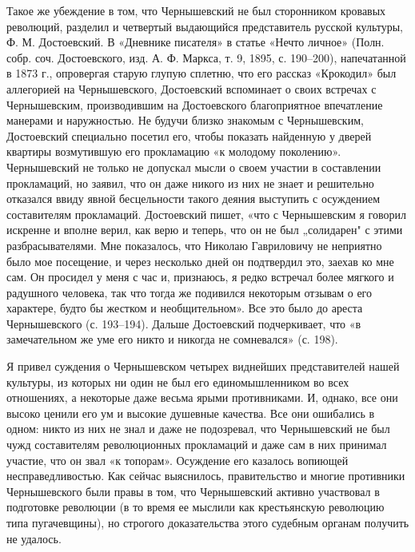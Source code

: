 Такое же убеждение в том, что Чернышевский не был сторонником кровавых
революций,  разделил  и  четвертый  выдающийся  представитель  русской
культуры, Ф.  М. Достоевский.  В «Дневнике  писателя» в  статье «Нечто
личное» (Полн. собр. соч. Достоевского, изд. А. Ф. Маркса, т. 9, 1895,
с.  190--200),  напечатанной  в  1873  г.,  опровергая  старую  глупую
сплетню, что  его рассказ «Крокодил» был  аллегорией на Чернышевского,
Достоевский вспоминает о своих  встречах с Чернышевским, производившим
на  Достоевского  благоприятное  впечатление манерами  и  наружностью.
Не  будучи  близко  знакомым с  Чернышевским,  Достоевский  специально
посетил его,  чтобы показать  найденную у дверей  квартиры возмутившую
его  прокламацию «к  молодому  поколению». Чернышевский  не только  не
допускал мысли о  своем участии в составлении  прокламаций, но заявил,
что  он даже  никого  из них  не знает  и  решительно отказался  ввиду
явной бесцельности  такого деяния выступить с  осуждением составителям
прокламаций. Достоевский пишет, «что с Чернышевским я говорил искренне
и вполне верил, как  верю и теперь, что он не  был „солидарен" с этими
разбрасывателями. Мне показалось, что Николаю Гавриловичу не неприятно
было мое посещение,  и через несколько дней он  подтвердил это, заехав
ко мне сам.  Он просидел у меня  с час и, признаюсь,  я редко встречал
более  мягкого  и  радушного  человека, так  что  тогда  же  подивился
некоторым отзывам о его характере,  будто бы жестком и необщительном».
Все это было до ареста Чернышевского (с. 193--194). Дальше Достоевский
подчеркивает,  что «в  замечательном же  уме  его никто  и никогда  не
сомневался» (с. 198).

Я  привел суждения  о  Чернышевском  четырех виднейших  представителей
нашей культуры, из которых ни один не был его единомышленником во всех
отношениях, а некоторые даже весьма ярыми противниками. И, однако, все
они  высоко  ценили  его  ум  и высокие  душевные  качества.  Все  они
ошибались в  одном: никто  из них  не знал и  даже не  подозревал, что
Чернышевский не был чужд составителям революционных прокламаций и даже
сам  в  них принимал  участие,  что  он  звал «к  топорам».  Осуждение
его  казалось  вопиющей   несправедливостью.  Как  сейчас  выяснилось,
правительство и многие противники Чернышевского  были правы в том, что
Чернышевский активно участвовал в подготовке  революции (в то время ее
мыслили  как крестьянскую  революцию  типа  пугачевщины), но  строгого
доказательства этого судебным органам получить не удалось.

